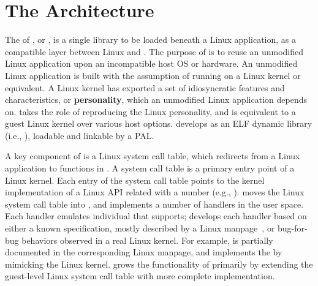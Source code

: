 \section{The \thelibos{} Architecture}


The \libos{} of \graphene{}, or 
\thelibos{},
is a single library to be loaded beneath a Linux application,
as a compatible layer between
Linux \linuxapis{} and \thehostabi{}.
The purpose of \thelibos{} is to reuse an unmodified Linux application
upon an incompatible host OS or hardware.
An unmodified Linux application is built with the assumption of running on a Linux kernel or equivalent.
A Linux kernel
has exported a set of idiosyncratic features and characteristics,
or {\bf personality},
which an unmodified Linux application depends on.
\thelibos{} takes the role of reproducing the Linux personality,
and is equivalent to a guest Linux kernel
over various host options.
\graphene{} develops \thelibos{} as an ELF dynamic library (i.e., ),
loadable and linkable by a PAL.


A key component of \thelibos{}
is a Linux system call table, which redirects \linuxapis{} from a Linux application to functions in \thelibos{}.
A system call table is a primary entry point of a Linux kernel.
Each entry of the system call table
points to the kernel implementation of a Linux API related with a \linuxapi{} number (e.g., ).
\graphene{} moves the Linux system call table into \thelibos{},
and implements a number of \linuxapi{} handlers in the user space.
Each \linuxapi{} handler emulates
individual \linuxapi{} that \graphene{} supports;
\graphene{} develops each handler
based on either a known specification, %
mostly described by a Linux manpage~\cite{linux-man-syscall},
or bug-for-bug behaviors
observed in a real Linux kernel.
For example,  is partially documented
in the corresponding Linux manpage, and \thelibos{} implements the \linuxapi{} by mimicking the Linux kernel.
\graphene{} grows the functionality of \thelibos{}
primarily by extending the guest-level Linux system call table
with more complete \linuxapi{} implementation.


